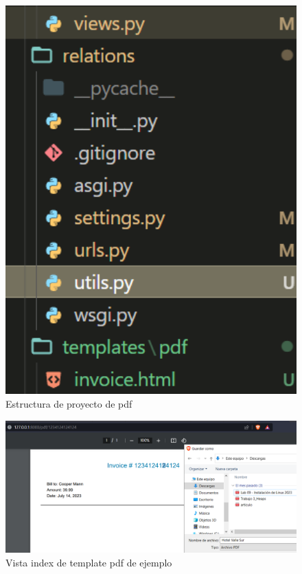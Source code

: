 \documentclass{article}
\begin{document}
        \begin{figure}
            \centering
            \includegraphics[width=150mm]{img/img9.png}
            \caption{Estructura de proyecto de pdf}
            \label{fig:enter-label}
        \end{figure}
        \begin{figure}
            \centering
            \includegraphics[width=150mm]{img/img10.png}
            \caption{Vista index de template pdf de ejemplo}
            \label{fig:enter-label}
        \end{figure}
\end{document}
